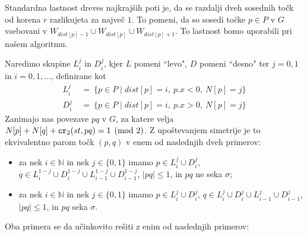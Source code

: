 \documentclass[a4paper, 12pt]{book}
\newcommand{\NN}{\ensuremath{\mathbb N}}  %
\def\dist{\mathit{dist}}
\newcommand\CR{\mbox{\tt cr}_2}		  %
\begin{document}
Standardna lastnost dreves najkrajših poti je, da se razdalji dveh sosednih točk od korena $r$ razlikujeta za največ $1$. To pomeni, da so sosedi točke $p\in P$ v $G$ vsebovani v $W_{\dist[p]-1}\cup W_{\dist[p]} \cup W_{\dist[p]+1}$. To lastnost bomo uporabili pri našem algoritmu.

Naredimo skupine $L_i^j$ in $D_i^j$, kjer $L$ pomeni ``levo", $D$ pomeni ``desno" ter $j=0,1$ in $i=0,1,...$, definirane kot
\begin{align*}
	L_i^j ~&=~ \{ p\in P \mid \dist[p]=i,~ p.x<0,~ N[p]=j \} \\
	D_i^j ~&=~ \{ p\in P \mid \dist[p]=i,~ p.x>0,~ N[p]=j \}
\end{align*}
Zanimajo nas povezave $pq$ v $G$, za katere velja $N[p]+N[q]+\CR(st,pq)=1 \pmod 2$. Z upoštevanjem simetrije je to ekvivalentno parom točk $(p, q)$ v enem od naslednjih dveh primerov:
\begin{itemize}
	\item za nek $i\in \NN$ in nek $j\in \{0,1\}$ imamo
			$p\in L_i^j\cup D_i^j$, 
			$q\in L_i^{1-j}\cup D_i^{1-j}\cup L_{i-1}^{1-j}\cup D_{i-1}^{1-j}$, 
			$|pq|\le 1$, in $pq$ ne seka $\sigma$;
	\item za nek $i\in \NN$ in nek $j\in \{0,1\}$ imamo
			$p\in L_i^j\cup D_i^j$, 
			$q\in L_i^{j}\cup D_i^{j}\cup L_{i-1}^{j}\cup D_{i-1}^{j}$, 
			$|pq|\le 1$, in $pq$ seka $\sigma$.
\end{itemize}
Oba primera se da učinkovito rešiti z enim od naslednjih primerov:
\end{document}
